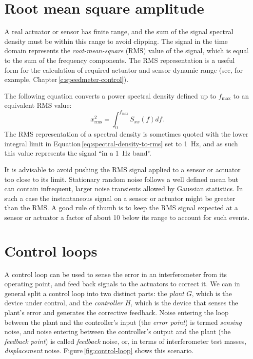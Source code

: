 \section{\label{sec:rms-amplitude}Root mean square amplitude}
A real actuator or sensor has finite range, and the sum of the signal spectral density must be within this range to avoid clipping. The signal in the time domain represents the \emph{root-mean-square} (\gls{RMS}) value of the signal, which is equal to the sum of the frequency components. The \gls{RMS} representation is a useful form for the calculation of required actuator and sensor dynamic range (see, for example, Chapter\,\ref{c:speedmeter-control}).

The following equation converts a power spectral density defined up to $f_{\text{max}}$ to an equivalent \gls{RMS} value:
\begin{equation}
  \label{eq:spectral-density-to-rms}
  x_{\text{rms}}^2 = \int^{f_{\text{max}}}_{0} S_{xx} \left( f \right) df.
\end{equation}
The \gls{RMS} representation of a spectral density is sometimes quoted with the lower integral limit in Equation\,\ref{eq:spectral-density-to-rms} set to \SI{1}{\hertz}, and as such this value represents the signal ``in a \SI{1}{\hertz} band''.

It is advisable to avoid pushing the \gls{RMS} signal applied to a sensor or actuator too close to its limit. Stationary random noise follows a well defined mean but can contain infrequent, larger noise transients allowed by Gaussian statistics. In such a case the instantaneous signal on a sensor or actuator might be greater than the \gls{RMS}. A good rule of thumb is to keep the \gls{RMS} signal expected at a sensor or actuator a factor of about \num{10} below its range to account for such events.

\section{Control loops}
A control loop can be used to sense the error in an interferometer from its operating point, and feed back signals to the actuators to correct it. We can in general split a control loop into two distinct parts: the \emph{plant} $G$, which is the device under control, and the \emph{controller} $H$, which is the device that senses the plant's error and generates the corrective feedback. Noise entering the loop between the plant and the controller's input (the \emph{error point}) is termed \emph{sensing} noise, and noise entering between the controller's output and the plant (the \emph{feedback point}) is called \emph{feedback} noise, or, in terms of interferometer test masses, \emph{displacement} noise. Figure\,\ref{fig:control-loop} shows this scenario.

